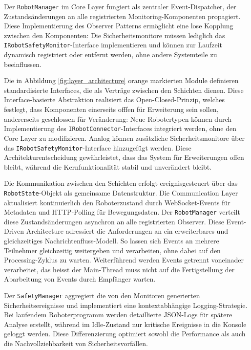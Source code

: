 Der \texttt{RobotManager} im Core Layer fungiert als zentraler
Event-Dispatcher, der Zustandsänderungen an alle registrierten
Monitoring-Komponenten propagiert. Diese Implementierung des Observer Patterns
ermöglicht eine lose Kopplung zwischen den
Komponenten: Die Sicherheitsmonitore müssen
lediglich das \texttt{IRobotSafetyMonitor}-Interface implementieren und können
zur Laufzeit dynamisch registriert oder entfernt werden, ohne andere Systemteile
zu beeinflussen.

Die in Abbildung \ref{fig:layer_architecture}
orange markierten Module definieren standardisierte Interfaces, die als Verträge
zwischen den Schichten dienen. Diese Interface-basierte Abstraktion realisiert
das Open-Closed-Prinzip, welches festlegt, dass Komponenten einerseits offfen
für Erweiterung sein sollen, andererseits geschlossen für
Veränderung: Neue Robotertypen können durch Implementierung
des \texttt{IRobotConnector}-Interfaces integriert werden, ohne den Core Layer
zu modifizieren. Analog können zusätzliche Sicherheitsmonitore über das
\texttt{IRobotSafetyMonitor}-Interface hinzugefügt werden. Diese
Architekturentscheidung gewährleistet, dass das System für Erweiterungen offen
bleibt, während die Kernfunktionalität stabil und unverändert bleibt.

Die Kommunikation zwischen den Schichten erfolgt ereignisgesteuert über das
\texttt{RobotState}-Objekt als gemeinsame Datenstruktur. Die Communication Layer
aktualisiert kontinuierlich den Roboterzustand durch WebSocket-Events für
Metadaten und HTTP-Polling für Bewegungsdaten. Der \texttt{RobotManager}
verteilt diese Zustandsänderungen asynchron an alle registrierten Observer.
Diese Event-Driven Architecture adressiert die Anforderungen an ein
erweiterbares und gleichzeitiges Nachrichtenfluss-Modell. So lassen sich Events
an mehrere Teilnehmer gleichzeitig weitergeben und verarbeiten, ohne dabei auf
den Processing-Zyklus zu warten. Weiterführend werden Events getrennt voneinader
verarbeitet, das heisst der Main-Thread muss nicht auf die Fertigstellung der
Abarbeitung von Events durch Empfänger warten.

Der \texttt{SafetyManager} aggregiert die von den Monitoren generierten
Sicherheitsereignisse und implementiert eine kontextabhängige Logging-Strategie.
Bei laufendem Roboterprogramm werden detaillierte JSON-Logs für spätere Analyse
erstellt, während im Idle-Zustand nur kritische Ereignisse in die Konsole
geloggt werden. Diese Differenzierung optimiert sowohl die Performance als auch
die Nachvollziehbarkeit von Sicherheitsvorfällen.


